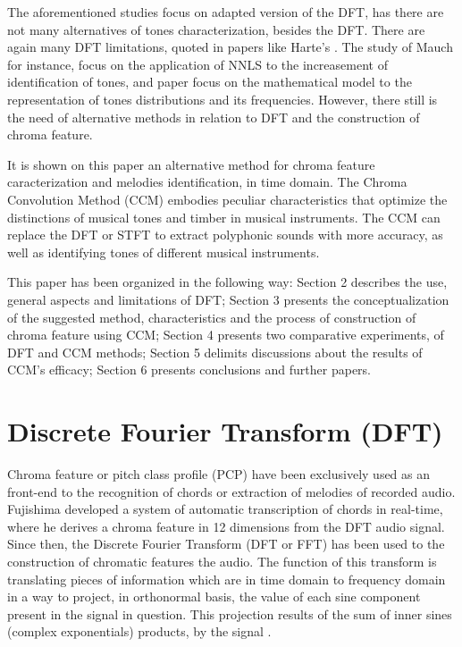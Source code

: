 \documentclass{article}
\begin{document}
The aforementioned studies focus on adapted version of the DFT, has there are not many alternatives of tones characterization, besides the DFT. There are again many DFT limitations, quoted in papers like Harte's \cite{harte2010towards}. The study of Mauch \cite{mauch2010approximate} for instance, focus on the application of NNLS to the increasement of identification of tones, and paper \cite{wakefield1999mathematical} focus on the mathematical model to the representation of tones distributions and its frequencies. However, there still is the need of alternative methods in relation to DFT and the construction of chroma feature.

It is shown on this paper an alternative method for chroma feature caracterization and melodies identification, in time domain. The Chroma Convolution Method (CCM) embodies peculiar characteristics that optimize the distinctions of musical tones and timber in musical instruments. The CCM can replace the DFT or STFT to extract polyphonic sounds with more accuracy, as well as identifying tones of different musical instruments.

	This paper has been organized in the following way: Section 2 describes the use, general aspects and limitations of DFT; Section 3 presents the conceptualization of the suggested method, characteristics and the process of construction of chroma feature using CCM; Section 4 presents two comparative experiments, of DFT and CCM methods; Section 5 delimits discussions about the results of CCM's efficacy; Section 6 presents conclusions and further papers. 

\section{Discrete Fourier Transform (DFT)}\label{sec:sfft}

	Chroma feature or pitch class profile (PCP) have been exclusively used as an front-end to the recognition of chords or extraction of melodies of recorded audio. Fujishima \cite{fujishima1999realtime} developed a system of automatic transcription of chords in real-time, where he derives a chroma feature in 12 dimensions from the DFT audio signal. Since then, the Discrete Fourier Transform (DFT or FFT) has been used to the construction of chromatic features the audio. The function of this transform is translating pieces of information which are in time domain to frequency domain in a way to project, in orthonormal basis, the value of each sine component present in the signal in question. This projection results of the sum of inner sines (complex exponentials) products, by the signal \cite{vaidyanathan1993multirate}.
\end{document}

